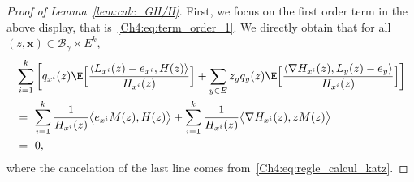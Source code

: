 \begin{refsegment}
\begin{proof}[Proof of Lemma~\ref{lem:calc_GH/H}]
First, we focus on the first order term in the above display, that is~\eqref{Ch4:eq:term_order_1}.
We directly obtain that for all $(z,\bm x)\in\mathscr{B}_\gamma\times E^k$,
\begin{align*}
& \sum_{i=1}^k \bigg[ q_{x^i}(z) \E\Big[\frac{\langle L_{x^i}(z) -e_{x^i}, H(z)\rangle}{H_{x^i}(z)}\Big] + \sum_{y\in E} z_y q_y(z) \E\Big[\frac{\langle \nabla H_{x^i}(z), L_y(z)-e_y\rangle}{H_{x^i}(z)}\Big]\bigg]\\
&=\ \sum_{i=1}^k \frac{1}{H_{x^i}(z)}\big\langle e_{x^i} M(z), H(z)\big\rangle + \sum_{i=1}^k\frac{ 1}{H_{x^i}(z)}\big\langle \nabla H_{x^i}(z), zM(z)\big\rangle \\
&=\ 0,
\end{align*}
where the cancelation of the last line comes 
from~\eqref{Ch4:eq:regle_calcul_katz}.


\end{proof}
\end{refsegment}

